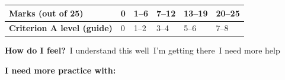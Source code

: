 \documentclass[12pt,a4paper]{article}
\begin{document}
\vspace{14pt}
\begin{tabular}{|p{5.4cm}|C{1.6cm}|C{1.6cm}|C{1.6cm}|C{1.6cm}|C{1.6cm}|}
\hline{}\textbf{Marks (out of 25)} & 0 & 1–6 & 7–12 & 13–19 & 20–25\\\hline
\textbf{Criterion A level (guide)} & 0 & 1–2 & 3–4 & 5–6 & 7–8\\\hline
\end{tabular}\par\vspace{6pt}
\textbf{How do I feel?}\quad \cb\ I understand this well\quad \cb\ I'm getting there\quad \cb\ I need more help\par\textbf{I need more practice with:} \blank[11cm]
\end{document}
